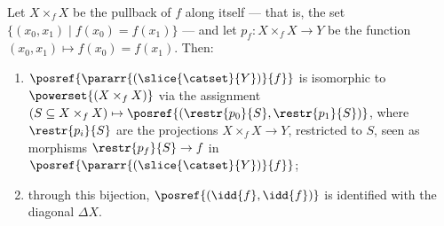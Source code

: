     \begingroup
    \def\theproposition{\ref{prop: dhom1 for set/y}}
    \begin{proposition}
        Let $X \times_f X$ be the pullback of $f$ along itself --- that is, the set $\{(x_0, x_1) \mid f(x_0) = f(x_1)\}$ --- and let $p_f\colon X \times_f X \to Y$ be the function $(x_0, x_1) \mapsto f(x_0) = f(x_1)$. Then:
            \begin{enumerate}
                \item $\posref{\pararr{(\slice{\catset}{Y})}{f}}$ is isomorphic to $\powerset{(X \times_f X)}$ via the assignment $(S \subseteq X \times_f X) \mapsto \posref{(\restr{p_0}{S}, \restr{p_1}{S})}$, where $\restr{p_i}{S}$ are the projections $X \times_f X \to Y$, restricted to $S$, seen as morphisms $\restr{p_f}{S} \to f$ in $\posref{\pararr{(\slice{\catset}{Y})}{f}}$;
                \item through this bijection, $\posref{(\idd{f}, \idd{f})}$ is identified with the diagonal $\Delta X$.
            \end{enumerate}
    \end{proposition}
    \addtocounter{proposition}{-1}
    \endgroup
